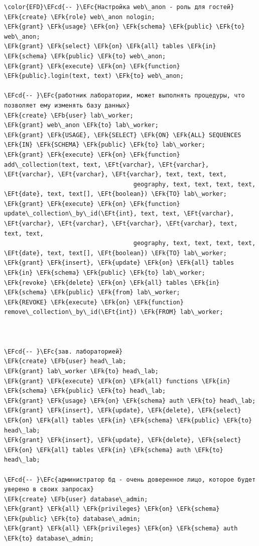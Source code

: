 \documentclass[14pt]{extarticle}
\newcommand{\EFc}[1]{\textcolor{EFc}{#1}} %
\newcommand{\EFcd}[1]{\textcolor{EFcd}{#1}} %
\newcommand{\EFk}[1]{\textcolor{EFk}{#1}} %
\newcommand{\EFb}[1]{\textcolor{EFb}{#1}} %
\newcommand{\EFt}[1]{\textcolor{EFt}{#1}} %
\begin{document}
\begin{Code}
\begin{Verbatim}
\color{EFD}\EFcd{-- }\EFc{Настройка web\_anon - роль для гостей}
\EFk{create} \EFk{role} web\_anon nologin;
\EFk{grant} \EFk{usage} \EFk{on} \EFk{schema} \EFk{public} \EFk{to} web\_anon;
\EFk{grant} \EFk{select} \EFk{on} \EFk{all} tables \EFk{in} \EFk{schema} \EFk{public} \EFk{to} web\_anon;
\EFk{grant} \EFk{execute} \EFk{on} \EFk{function} \EFk{public}.login(text, text) \EFk{to} web\_anon;

\EFcd{-- }\EFc{работник лаборатории, может выполнять процедуры, что позволяет ему изменять базу данных}
\EFk{create} \EFb{user} lab\_worker;
\EFk{grant} web\_anon \EFk{to} lab\_worker;
\EFk{grant} \EFk{USAGE}, \EFk{SELECT} \EFk{ON} \EFk{ALL} SEQUENCES \EFk{IN} \EFk{SCHEMA} \EFk{public} \EFk{to} lab\_worker;
\EFk{grant} \EFk{execute} \EFk{on} \EFk{function} add\_collection(text, text, \EFt{varchar}, \EFt{varchar}, \EFt{varchar}, \EFt{varchar}, \EFt{varchar}, text, text, text,
                                    geography, text, text, text, text, \EFt{date}, text, text[], \EFt{boolean}) \EFk{TO} lab\_worker;
\EFk{grant} \EFk{execute} \EFk{on} \EFk{function} update\_collection\_by\_id(\EFt{int}, text, text, \EFt{varchar}, \EFt{varchar}, \EFt{varchar}, \EFt{varchar}, \EFt{varchar}, text, text, text,
                                    geography, text, text, text, text, \EFt{date}, text, text[], \EFt{boolean}) \EFk{TO} lab\_worker;
\EFk{grant} \EFk{insert}, \EFk{update} \EFk{on} \EFk{all} tables \EFk{in} \EFk{schema} \EFk{public} \EFk{to} lab\_worker;
\EFk{revoke} \EFk{delete} \EFk{on} \EFk{all} tables \EFk{in} \EFk{schema} \EFk{public} \EFk{from} lab\_worker;
\EFk{REVOKE} \EFk{execute} \EFk{on} \EFk{function} remove\_collection\_by\_id(\EFt{int}) \EFk{FROM} lab\_worker;



\EFcd{-- }\EFc{зав. лабораторией}
\EFk{create} \EFb{user} head\_lab;
\EFk{grant} lab\_worker \EFk{to} head\_lab;
\EFk{grant} \EFk{execute} \EFk{on} \EFk{all} functions \EFk{in} \EFk{schema} \EFk{public} \EFk{to} head\_lab;
\EFk{grant} \EFk{usage} \EFk{on} \EFk{schema} auth \EFk{to} head\_lab;
\EFk{grant} \EFk{insert}, \EFk{update}, \EFk{delete}, \EFk{select} \EFk{on} \EFk{all} tables \EFk{in} \EFk{schema} \EFk{public} \EFk{to} head\_lab;
\EFk{grant} \EFk{insert}, \EFk{update}, \EFk{delete}, \EFk{select} \EFk{on} \EFk{all} tables \EFk{in} \EFk{schema} auth \EFk{to} head\_lab;

\EFcd{-- }\EFc{администратор бд - очень доверенное лицо, которое будет уверено в своих запросах}
\EFk{create} \EFb{user} database\_admin;
\EFk{grant} \EFk{all} \EFk{privileges} \EFk{on} \EFk{schema} \EFk{public} \EFk{to} database\_admin;
\EFk{grant} \EFk{all} \EFk{privileges} \EFk{on} \EFk{schema} auth \EFk{to} database\_admin;

\end{Verbatim}
\end{Code}
\end{document}
